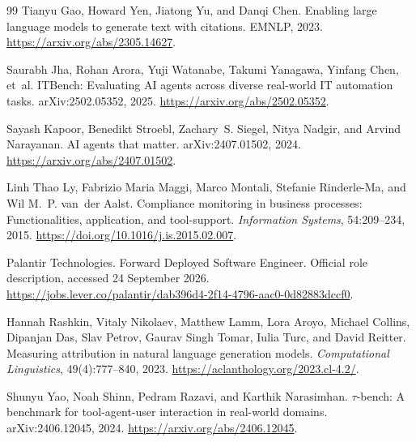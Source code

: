 \begin{thebibliography}{99}
Tianyu Gao, Howard Yen, Jiatong Yu, and Danqi Chen.
\newblock Enabling large language models to generate text with citations.
\newblock EMNLP, 2023.
\newblock \url{https://arxiv.org/abs/2305.14627}.

Saurabh Jha, Rohan Arora, Yuji Watanabe, Takumi Yanagawa, Yinfang Chen, et~al.
\newblock ITBench: Evaluating AI agents across diverse real-world IT automation tasks.
\newblock arXiv:2502.05352, 2025.
\newblock \url{https://arxiv.org/abs/2502.05352}.

Sayash Kapoor, Benedikt Stroebl, Zachary~S. Siegel, Nitya Nadgir, and Arvind Narayanan.
\newblock AI agents that matter.
\newblock arXiv:2407.01502, 2024.
\newblock \url{https://arxiv.org/abs/2407.01502}.

Linh Thao Ly, Fabrizio Maria Maggi, Marco Montali, Stefanie Rinderle-Ma,
and Wil M.~P. van~der Aalst.
\newblock Compliance monitoring in business processes: Functionalities, application, and tool-support.
\newblock \emph{Information Systems}, 54:209--234, 2015.
\newblock \url{https://doi.org/10.1016/j.is.2015.02.007}.

Palantir Technologies.
\newblock Forward Deployed Software Engineer.
\newblock Official role description, accessed 24 September 2026.
\newblock \url{https://jobs.lever.co/palantir/dab396d4-2f14-4796-aac0-0d82883dccf0}.

Hannah Rashkin, Vitaly Nikolaev, Matthew Lamm, Lora Aroyo, Michael Collins,
Dipanjan Das, Slav Petrov, Gaurav Singh Tomar, Iulia Turc, and David Reitter.
\newblock Measuring attribution in natural language generation models.
\newblock \emph{Computational Linguistics}, 49(4):777--840, 2023.
\newblock \url{https://aclanthology.org/2023.cl-4.2/}.

Shunyu Yao, Noah Shinn, Pedram Razavi, and Karthik Narasimhan.
\newblock $\tau$-bench: A benchmark for tool-agent-user interaction in real-world domains.
\newblock arXiv:2406.12045, 2024.
\newblock \url{https://arxiv.org/abs/2406.12045}.

\end{thebibliography}
